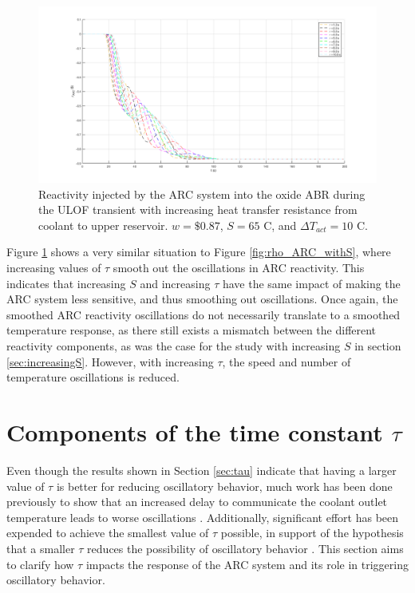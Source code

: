 \documentclass[11pt, oneside]{article}   	%
\begin{document}
\begin{figure}[h!]
\includegraphics[width=18cm]{rho_ARC_withTau}
\centering
\caption{Reactivity injected by the ARC system into the oxide ABR during the ULOF transient with increasing heat transfer resistance from coolant to upper reservoir. $w=\$0.87$, $S=65$ C, and $\Delta T_{act}=10$ C.}
\label{fig:rho_ARC_withTau}
\end{figure}

Figure \ref{fig:rho_ARC_withTau} shows a very similar situation to Figure \ref{fig:rho_ARC_withS}, where increasing values of $\tau$ smooth out the oscillations in ARC reactivity.
This indicates that increasing $S$ and increasing $\tau$ have the same impact of making the ARC system less sensitive, and thus smoothing out oscillations.
Once again, the smoothed ARC reactivity oscillations do not necessarily translate to a smoothed temperature response, as there still exists a mismatch between the different reactivity components, as was the case for the study with increasing $S$ in section \ref{sec:increasingS}.
However, with increasing $\tau$, the speed and number of temperature oscillations is reduced.

\section{Components of the time constant $\tau$}

Even though the results shown in Section \ref{sec:tau} indicate that having a larger value of $\tau$ is better for reducing oscillatory behavior, much work has been done previously to show that an increased delay to communicate the coolant outlet temperature leads to worse oscillations \cite{ARC_Annals}.
Additionally, significant effort has been expended to achieve the smallest value of $\tau$ possible, in support of the hypothesis that a smaller $\tau$ reduces the possibility of oscillatory behavior \cite{MalwinaReport}.
This section aims to clarify how $\tau$ impacts the response of the ARC system and its role in triggering oscillatory behavior.
\end{document}
